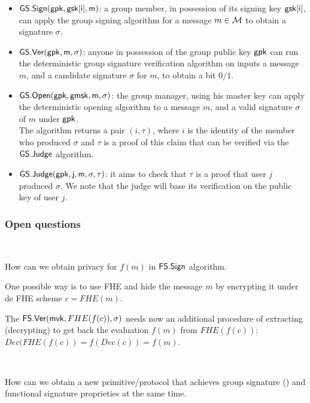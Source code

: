 \documentclass[11pt]{llncs}
\begin{document}
{\begin{itemize}
\item $ {\sf GS.Sign}(\sf gpk, \sf gsk[i], m)$: a group member, in possession of its signing key $\sf gsk[i]$, 
can apply the group signing algorithm for a message $m \in {\cal M}$ to obtain a signature $\sigma$.\\

\item ${\sf GS.Ver}(\sf gpk,  m, \sigma)$: anyone in possession of the group public key $\sf gpk$ can run the deterministic group signature
verification algorithm on inputs a message $m$, and a candidate signature $\sigma$ for $m$, to obtain
a bit $0/1$. \\

\item ${\sf GS.Open}(\sf gpk, \sf gmsk, m, \sigma)$: the group manager, using his master key
can apply the deterministic opening algorithm to
a message $m$, and a valid signature $\sigma$ of $m$ under $\sf gpk$.\\
The algorithm returns a pair $(i, \tau)$, where $i$ is the identity of the member who produced $\sigma$
 and $\tau$ is a proof of this claim that can be verified via the ${\sf GS.Judge}$ algorithm.\\
 
 \item ${\sf GS.Judge}(\sf gpk, j , m, \sigma, \tau)$: it aims to check that $\tau$ is a proof that user $j$
produced $\sigma$. We note that the judge will base its verification on the public key of user $j$.

\end{itemize}


\subsubsection*{Open questions}
\ \\


How can we obtain privacy for  $f(m)$ in ${\sf FS.Sign}$ algorithm. 

One possible way is to use FHE and hide the message $m$ by encrypting it under de FHE scheme  $c = FHE(m)$.

The ${\sf FS.Ver}({\sf mvk},  FHE(f(c)), \sigma) $ needs now an additional procedure of extracting (decrypting) to get back the evaluation $f(m)$ from  $FHE(f(c))$: $Dec(FHE(f(c))=f(Dec(c))=f(m)$.

\ \\


How can we obtain a new primitive/protocol that achieves group signature (\cite{C:BonBoySha04}) and functional signature proprieties at the same time.

}
\end{document}
